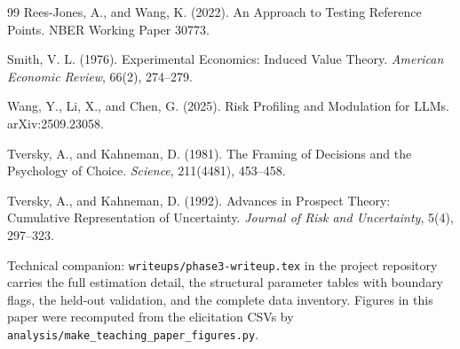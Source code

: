 \documentclass[11pt]{article}
\begin{document}
\begin{thebibliography}{99}
Rees-Jones, A., and Wang, K. (2022).
An Approach to Testing Reference Points. NBER Working Paper 30773.

Smith, V. L. (1976).
Experimental Economics: Induced Value Theory. \textit{American Economic Review}, 66(2), 274--279.

Wang, Y., Li, X., and Chen, G. (2025).
Risk Profiling and Modulation for LLMs. arXiv:2509.23058.

Tversky, A., and Kahneman, D. (1981).
The Framing of Decisions and the Psychology of Choice. \textit{Science}, 211(4481), 453--458.

Tversky, A., and Kahneman, D. (1992).
Advances in Prospect Theory: Cumulative Representation of Uncertainty.
\textit{Journal of Risk and Uncertainty}, 5(4), 297--323.

\end{thebibliography}

\vspace{8pt}
{\footnotesize\color{mutegray}
Technical companion: \texttt{writeups/phase3-writeup.tex} in the project repository carries the
full estimation detail, the structural parameter tables with boundary flags, the held-out
validation, and the complete data inventory. Figures in this paper were recomputed from the
elicitation CSVs by \texttt{analysis/make\_teaching\_paper\_figures.py}.}
\end{document}
